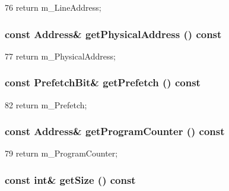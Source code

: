 \begin{DoxyCode}
76 { return m_LineAddress; }
\end{DoxyCode}
\hypertarget{classRubyRequest_abbc0034e2c929ff925dc7c9fd1128110}{
\subsubsection[{getPhysicalAddress}]{\setlength{\rightskip}{0pt plus 5cm}const {\bf Address}\& getPhysicalAddress () const}}
\label{classRubyRequest_abbc0034e2c929ff925dc7c9fd1128110}



\begin{DoxyCode}
77 { return m_PhysicalAddress; }
\end{DoxyCode}
\hypertarget{classRubyRequest_ad92e4eed0c01509c3469c38da385d0c0}{
\subsubsection[{getPrefetch}]{\setlength{\rightskip}{0pt plus 5cm}const PrefetchBit\& getPrefetch () const}}
\label{classRubyRequest_ad92e4eed0c01509c3469c38da385d0c0}



\begin{DoxyCode}
82 { return m_Prefetch; }
\end{DoxyCode}
\hypertarget{classRubyRequest_a9be9ffdd4d619ecc2572291d09e374ed}{
\subsubsection[{getProgramCounter}]{\setlength{\rightskip}{0pt plus 5cm}const {\bf Address}\& getProgramCounter () const}}
\label{classRubyRequest_a9be9ffdd4d619ecc2572291d09e374ed}



\begin{DoxyCode}
79 { return m_ProgramCounter; }
\end{DoxyCode}
\hypertarget{classRubyRequest_a50b2018251eb77a7549ee1d6e99df50f}{
\subsubsection[{getSize}]{\setlength{\rightskip}{0pt plus 5cm}const int\& getSize () const}}
\label{classRubyRequest_a50b2018251eb77a7549ee1d6e99df50f}



